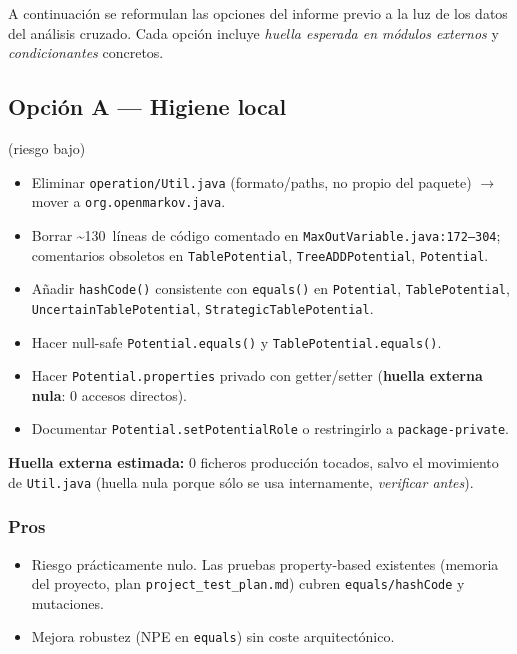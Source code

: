 \documentclass[11pt,a4paper]{article}
\newcommand{\code}[1]{\texttt{#1}}
\newcommand{\good}[1]{\textcolor{codegreen}{\textbf{#1}}}
\begin{document}
A continuación se reformulan las opciones del informe previo a la luz de los
datos del análisis cruzado. Cada opción incluye \emph{huella esperada en
módulos externos} y \emph{condicionantes} concretos.

\subsection{Opción A --- Higiene local} (riesgo bajo)

\begin{itemize}[leftmargin=*]
  \item Eliminar \code{operation/Util.java} (formato/paths, no propio del
        paquete) $\to$ mover a \code{org.openmarkov.java}.
  \item Borrar \textasciitilde 130~líneas de código comentado en
        \code{MaxOutVariable.java:172--304}; comentarios obsoletos en
        \code{TablePotential}, \code{TreeADDPotential}, \code{Potential}.
  \item Añadir \code{hashCode()} consistente con \code{equals()} en
        \code{Potential}, \code{TablePotential},
        \code{Uncertain\-Table\-Potential},
        \code{StrategicTablePotential}.
  \item Hacer null-safe \code{Potential.equals()} y \code{TablePotential.equals()}.
  \item Hacer \code{Potential.properties} privado con getter/setter
        (\good{huella externa nula}: 0 accesos directos).
  \item Documentar \code{Potential.setPotentialRole} o restringirlo a
        \code{package-private}.
\end{itemize}

\textbf{Huella externa estimada:} 0 ficheros producción tocados, salvo el
movimiento de \code{Util.java} (huella nula porque sólo se usa internamente,
\emph{verificar antes}).

\subsubsection*{Pros}
\begin{itemize}[leftmargin=*]
  \item Riesgo prácticamente nulo. Las pruebas property-based existentes
        (memoria del proyecto, plan \code{project\_test\_plan.md}) cubren
        \code{equals/hashCode} y mutaciones.
  \item Mejora robustez (NPE en \code{equals}) sin coste arquitectónico.
\end{itemize}
\end{document}
